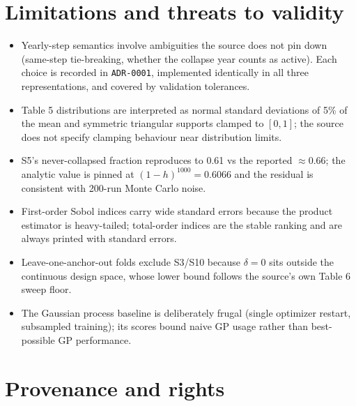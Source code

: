\documentclass[11pt]{article}
\begin{document}
\section{Limitations and threats to validity}
\label{sec:limitations}

\begin{itemize}
  \item Yearly-step semantics involve ambiguities the source does not pin down
        (same-step tie-breaking, whether the collapse year counts as active). Each
        choice is recorded in \texttt{ADR-0001}, implemented identically in all three
        representations, and covered by validation tolerances.
  \item Table 5 distributions are interpreted as normal standard deviations of 5\% of
        the mean and symmetric triangular supports clamped to $[0,1]$; the source does
        not specify clamping behaviour near distribution limits.
  \item S5's never-collapsed fraction reproduces to 0.61 vs the reported $\approx
        0.66$; the analytic value is pinned at $(1-h)^{1000} = 0.6066$ and the residual
        is consistent with 200-run Monte Carlo noise.
  \item First-order Sobol indices carry wide standard errors because the product
        estimator is heavy-tailed; total-order indices are the stable ranking and are
        always printed with standard errors.
  \item Leave-one-anchor-out folds exclude S3/S10 because $\delta = 0$ sits outside
        the continuous design space, whose lower bound follows the source's own Table 6
        sweep floor.
  \item The Gaussian process baseline is deliberately frugal (single optimizer
        restart, subsampled training); its scores bound naive GP usage rather than
        best-possible GP performance.
\end{itemize}

\section{Provenance and rights}
\label{sec:provenance}
\end{document}
